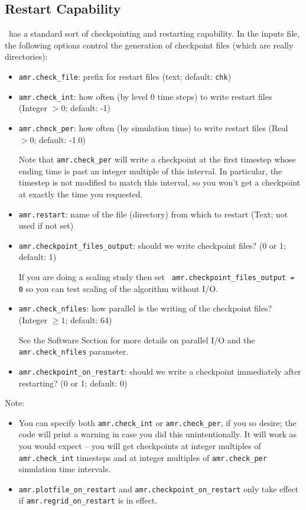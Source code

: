 \subsection{Restart Capability}

\iamr\ has a standard sort of checkpointing and restarting capability. 
In the inputs file, the following options control the generation of
checkpoint files (which are really directories):
\begin{itemize}
\item {\tt amr.check\_file}: prefix for restart files (text; default: {\tt chk}) 

\item {\tt amr.check\_int}: how often (by level 0 time steps) to write
   restart files (Integer $> 0$; default: -1)

\item {\tt amr.check\_per}: how often (by simulation time) to
  write restart files (Real $> 0$; default: -1.0)

  Note that {\tt amr.check\_per} will write a checkpoint at the first
  timestep whose ending time is past an integer multiple of this interval.
  In particular, the timestep is not modified to match this interval, so
  you won't get a checkpoint at exactly the time you requested.

\item {\tt amr.restart}: name of the file (directory) from which to restart
  (Text; not used if not set)

\item {\tt amr.checkpoint\_files\_output}: should we write checkpoint files? (0 or 1; default: 1)

  If you are doing a scaling study then set {\tt
  amr.checkpoint\_files\_output = 0} so you can test scaling of the
  algorithm without I/O.

\item {\tt amr.check\_nfiles}: how parallel is the writing of the checkpoint files?
  (Integer $\geq 1$; default: 64)

  See the Software Section for more details on parallel I/O and the 
  {\tt amr.check\_nfiles} parameter.

\item {\tt amr.checkpoint\_on\_restart}: should we write a checkpoint immediately after restarting?
  (0 or 1; default: 0)
\end{itemize}


Note:
\begin{itemize}

\item You can specify both {\tt amr.check\_int} or {\tt amr.check\_per},
  if you so desire; the code will print a warning in case you did this
  unintentionally. It will work as you would expect -- you will get checkpoints
  at integer multiples of {\tt amr.check\_int} timesteps and at integer
  multiples of {\tt amr.check\_per} simulation time intervals.

\item {\tt amr.plotfile\_on\_restart} and {\tt amr.checkpoint\_on\_restart} 
only take effect if {\tt amr.regrid\_on\_restart} is in effect.
\end{itemize}

